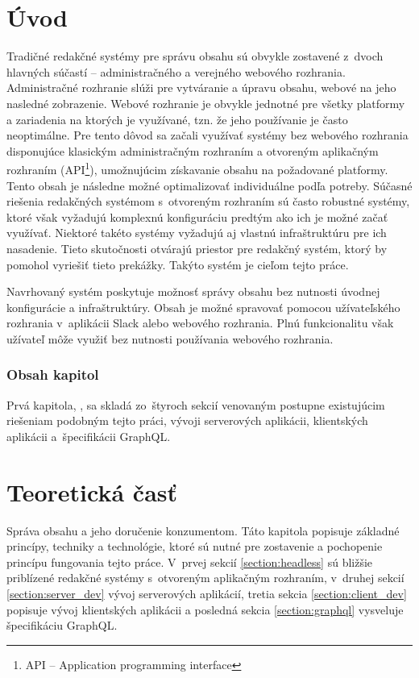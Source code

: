 \chapter{Úvod}
Tradičné redakčné systémy pre správu obsahu sú obvykle zostavené z~dvoch hlavných súčastí -- administračného a verejného webového rozhrania. Administračné rozhranie slúži pre vytváranie a úpravu obsahu, webové na jeho nasledné zobrazenie. Webové rozhranie je obvykle jednotné pre všetky platformy a zariadenia na ktorých je využívané, tzn. že jeho používanie je často neoptimálne. Pre tento dôvod sa začali využívať systémy bez webového rozhrania disponujúce klasickým administračným rozhraním a otvoreným aplikačným rozhraním (API\footnote{API -- Application programming interface}), umožnujúcim získavanie obsahu na požadované platformy. Tento obsah je následne možné optimalizovať individuálne podľa potreby. Súčasné riešenia redakčných systémom s~otvoreným rozhraním sú často robustné systémy, ktoré však vyžadujú komplexnú konfiguráciu predtým ako ich je možné začať využívať. Niektoré takéto systémy vyžadujú aj vlastnú infraštruktúru pre ich nasadenie. Tieto skutočnosti otvárajú priestor pre redakčný systém, ktorý by pomohol vyriešiť tieto prekážky. Takýto systém je cieľom tejto práce.

Navrhovaný systém poskytuje možnosť správy obsahu bez nutnosti úvodnej konfigurácie a infraštruktúry. Obsah je možné spravovať pomocou užívateľského rozhrania v~aplikácii Slack alebo webového rozhrania. Plnú funkcionalitu však užívateľ môže využiť bez nutnosti používania webového rozhrania.

\subsection*{Obsah kapitol}
Prvá kapitola, , sa skladá zo~štyroch sekcií venovaným postupne existujúcim riešeniam podobným tejto práci, vývoji serverových aplikácii, klientských aplikácii a~špecifikácii GraphQL.


\chapter{Teoretická časť}
\label{chapter:theory}
Správa obsahu a jeho doručenie konzumentom. Táto kapitola popisuje základné princípy, techniky a technológie, ktoré sú nutné pre zostavenie a pochopenie princípu fungovania tejto práce. V~prvej sekcií \ref{section:headless} sú bližšie priblízené redakčné systémy s~otvoreným aplikačným rozhraním, v~druhej sekcií \ref{section:server_dev} vývoj serverových aplikácií, tretia sekcia \ref{section:client_dev} popisuje vývoj klientských aplikácii a posledná sekcia \ref{section:graphql} vysveluje špecifikáciu GraphQL.

